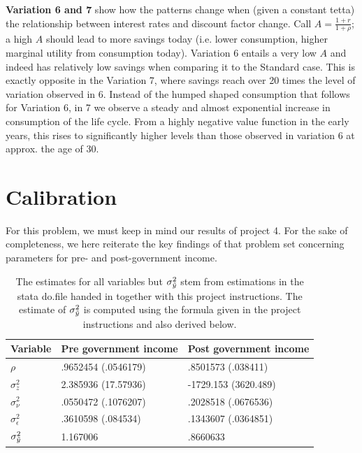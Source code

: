 \documentclass[12pt,a4paper]{article}
\begin{document}
\textbf{Variation 6 and 7} show how the patterns change when (given a constant tetta) the relationship between interest rates and discount factor change. Call $A = \frac{1+r}{1+\rho}$; a high $A$ should lead to more savings today (i.e. lower consumption, higher marginal utility from consumption today). Variation 6 entails a very low $A$ and indeed has relatively low savings when comparing it to the Standard case. This is exactly opposite in the Variation 7, where savings reach over 20 times the level of variation observed in 6. Instead of the humped shaped consumption that follows for Variation 6, in 7 we observe a steady and almost exponential increase in consumption of the life cycle. From a highly negative value function in the early years, this rises to significantly higher levels than those observed in variation 6 at approx. the age of 30.\\


\section{Calibration}

For this problem, we must keep in mind our results of project 4. For the sake of completeness, we here reiterate the key findings of that problem set concerning parameters for pre- and post-government income.

\begin{table}[h]
\begin{tabular}{|l|l|l|}
\hline
\textbf{Variable} & \textbf{Pre government income} & \textbf{Post government income}  \\ \hline
$\rho$                        &   .9652454 (.0546179)  &  .8501573  (.038411)         \\ \hline
$\sigma^2_z$                  &   2.385936 (17.57936)  &  -1729.153 (3620.489)        \\ \hline
$\sigma^2_\nu$                &   .0550472 (.1076207)  &   .2028518 (.0676536)        \\ \hline
$\sigma^2_\epsilon$           &   .3610598  (.084534)  &   .1343607 (.0364851)        \\ \hline
$\sigma^2_{\Tilde{y}}$        &   1.167006             &   .8660633                   \\ \hline
\end{tabular}
\caption{The estimates for all variables but $\sigma^2_{\Tilde{y}}$ stem from estimations in the stata do.file handed in together with this project instructions. The estimate of $\sigma^2_{\Tilde{y}}$ is computed using the formula given in the project instructions and also derived below.}
\end{table}
\end{document}
